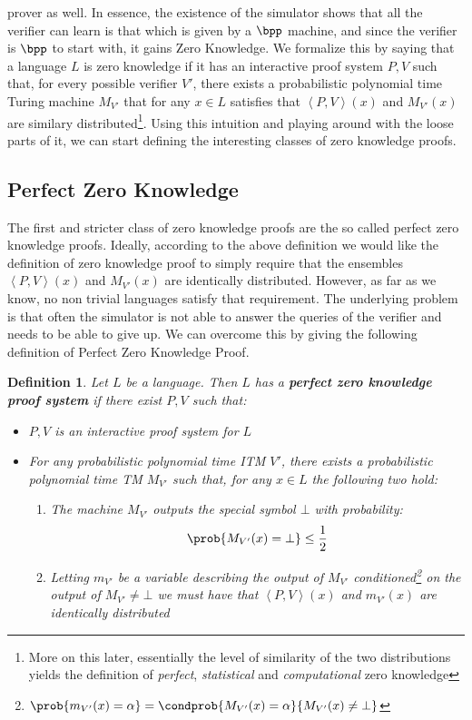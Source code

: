 \documentclass{article}
\newtheorem{definition}{Definition}
\begin{document}
prover as well. In essence, the existence of the simulator shows that all the verifier can learn is that which is given
by a $\bpp$ machine, and since the verifier is $\bpp$ to start with, it gains Zero Knowledge.
We formalize this by saying that a language $L$ is zero knowledge if it has an interactive proof system $P, V$ such
that, for every possible verifier $V'$, there exists a probabilistic polynomial time Turing machine $M_{V'}$ that
for any $x \in L$ satisfies that $\left<P, V\right>(x)$ and $M_{V'}(x)$ are similary
distributed\footnote{More on this later, essentially the level of similarity of the two distributions yields
    the definition of \textit{perfect}, \textit{statistical} and \textit{computational} zero knowledge}.
Using this intuition and playing around with the loose parts of it, we can start defining the interesting classes of zero knowledge proofs.
\subsection{Perfect Zero Knowledge}
The first and stricter class of zero knowledge proofs are the so called perfect zero knowledge proofs.
Ideally, according to the above definition we would like the definition of zero knowledge proof to simply require
that the ensembles $\left<P, V\right>(x)$ and $M_{V'}(x)$ are identically distributed.
However, as far as we know, no non trivial languages satisfy that requirement.
The underlying problem is that often the simulator is not able to answer the queries of the verifier
and needs to be able to give up. We can overcome this by giving the following definition of Perfect Zero Knowledge Proof.
\begin{definition}
    Let $L$ be a language. Then $L$ has a \textbf{perfect zero knowledge proof system} if there exist $P, V$ such that:
    \begin{itemize}
        \item $P, V$ is an interactive proof system for $L$
        \item For any probabilistic polynomial time ITM $V'$, there exists a probabilistic polynomial time TM $M_{V'}$ such that, for any $x \in L$ the following two hold:
              \begin{enumerate}
                  \item The machine $M_{V'}$ outputs the special symbol $\bot$ with probability: \[\prob{M_{V'}(x) = \bot} \leq \frac{1}{2}\]
                  \item Letting $m_{V'}$ be a variable describing the output of $M_{V'}$ conditioned\footnote{$\prob{m_{V'}(x) = \alpha} = \condprob{M_{V'}(x) = \alpha}{M_{V'}(x) \neq \bot}$} on the output of $M_{V'} \neq \bot$  we must have that $\left<P, V\right>(x)$ and $m_{V'}(x)$ are identically distributed
              \end{enumerate}
    \end{itemize}
\end{definition}
\end{document}

